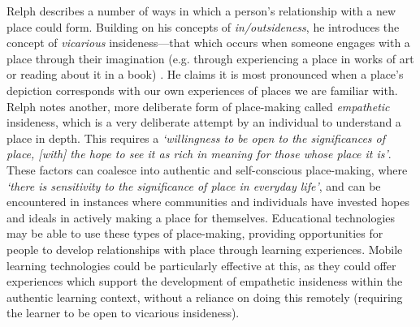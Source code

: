 Relph describes a number of ways in which a person's relationship with a new place could form. Building on his concepts of \textit{in/outsideness}, he introduces the concept of \textit{vicarious} insideness---that which occurs when someone engages with a place through their imagination (e.g. through experiencing a place in works of art or reading about it in a book) \citep{Relph2018}. He claims it is most pronounced when a place's depiction corresponds with our own experiences of places we are familiar with. Relph notes another, more deliberate form of place-making called \textit{empathetic} insideness, which is a very deliberate attempt by an individual to understand a place in depth. This requires a \textit{`willingness to be open to the significances of place, [with] the hope to see it as rich in meaning for those whose place it is'}. These factors can coalesce into authentic and self-conscious place-making, where \textit{`there is sensitivity to the significance of place in everyday life'}, and can be encountered in instances where communities and individuals have invested hopes and ideals in actively making a place for themselves. Educational technologies may be able to use these types of place-making, providing opportunities for people to develop relationships with place through learning experiences. Mobile learning technologies could be particularly effective at this, as they could offer experiences which support the development of empathetic insideness within the authentic learning context, without a reliance on doing this remotely (requiring the learner to be open to vicarious insideness).

